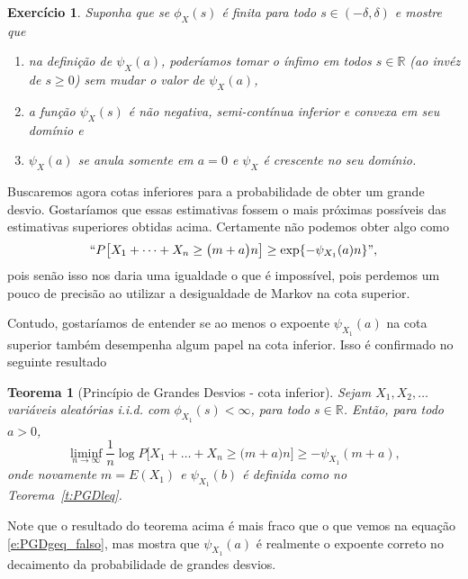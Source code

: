 \documentclass[reqno]{article}
\newcommand*\1{\mathds{1}}
\newtheorem{theorem}{Teorema}[section]
\newtheorem{exercise}[example]{Exercício}
\begin{document}
\begin{exercise}
  Suponha que se $\phi_{X}(s)$ é finita para todo $s \in (-\delta, \delta)$ e mostre que
  \begin{enumerate}
  \item na definição de $\psi_{X}(a)$, poderíamos tomar o ínfimo em todos $s \in \mathbb{R}$ (ao invéz de $s \geq 0$) sem mudar o valor de $\psi_X(a)$,
  \item a função $\psi_{X}(s)$ é não negativa, semi-contínua inferior e convexa em seu domínio e
  \item $\psi_X(a)$ se anula somente em $a = 0$ e $\psi_X$ é crescente no seu domínio.
  \end{enumerate}
\end{exercise}

Buscaremos agora cotas inferiores para a probabilidade de obter um grande desvio.
Gostaríamos que essas estimativas fossem o mais próximas possíveis das estimativas superiores obtidas acima.
Certamente não podemos obter algo como
\begin{equation}
  \label{e:PGDgeq_falso}
  `` P\big[ X_1 + \dots + X_n \geq \big(m + a \big) n \big] \geq \exp\{-\psi_{X_1}(a) n\} ",
\end{equation}
pois senão isso nos daria uma igualdade o que é impossível, pois perdemos um pouco de precisão ao utilizar a desigualdade de Markov na cota superior.

Contudo, gostaríamos de entender se ao menos o expoente $\psi_{X_1}(a)$ na cota superior também desempenha algum papel na cota inferior.
Isso é confirmado no seguinte resultado

\begin{theorem}[Princípio de Grandes Desvios - cota inferior]
  \label{t:PGDgeq}
  Sejam $X_1, X_2, \dots$ variáveis aleatórias i.i.d. com $\phi_{X_1}(s) < \infty$, para todo $s \in \mathbb{R}$.
  Então, para todo $a > 0$,
  \begin{equation}
    \liminf_{n \to \infty} \frac{1}{n} \log P\big[ X_1 + \dots + X_n \geq \big(m + a \big) n \big] \geq -\psi_{X_1}(m + a),
  \end{equation}
  onde novamente $m = E(X_1)$ e $\psi_{X_1}(b)$ é definida como no Teorema~\ref{t:PGDleq}.
\end{theorem}

Note que o resultado do teorema acima é mais fraco que o que vemos na equação \eqref{e:PGDgeq_falso}, mas mostra que $\psi_{X_1}(a)$ é realmente o expoente correto no decaimento da probabilidade de grandes desvios.
\end{document}

